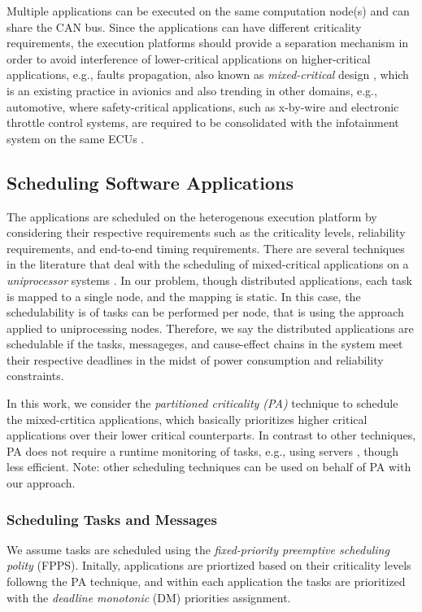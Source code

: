 Multiple applications can be executed on the same computation node(s) and can share the CAN bus. Since the applications can have different criticality requirements, the execution platforms should provide a separation mechanism in order to avoid interference of lower-critical applications on higher-critical applications, e.g., faults propagation, also known as   \textit{mixed-critical} design \cite{Vestal2007PreemptiveAssurance}, which is an existing practice in avionics and also trending in other domains, e.g., automotive, where  safety-critical applications, such as x-by-wire and electronic throttle control systems, are required to be consolidated with the infotainment system on the same ECUs \cite{bibid}.

\subsection{Scheduling Software Applications}
The applications are scheduled on the heterogenous execution platform by considering their respective requirements such as the criticality levels, reliability requirements, and end-to-end timing requirements. There are several techniques in the literature that deal with the scheduling of mixed-critical applications on a \textit{uniprocessor} systems \cite{Vestal2007PreemptiveAssurance}. In our problem, though distributed applications, each task is mapped to a single node, and the mapping is static. In this case, the schedulability is of tasks can be performed per node, that is using the approach applied to uniprocessing nodes. Therefore, we say the distributed applications are schedulable if the tasks, messageges, and cause-effect chains in the system meet their respective deadlines in the midst of power consumption and reliability constraints. 

In this work, we consider the \textit{partitioned criticality (PA)}  technique to schedule the mixed-crtitica applications, which basically prioritizes higher critical applications over their lower critical counterparts. In contrast to other techniques, PA does not require a runtime monitoring of tasks, e.g., using servers \cite{AbeniIntegratingSystems,Ashjaei2017DesigningSystems,Inam2014ThePlatforms}, though less efficient. Note: other scheduling techniques can be used on behalf of PA with our approach.

\subsubsection{Scheduling Tasks and Messages}\label{subsec_responsetimeanalysis}
We assume tasks are scheduled using the \textit{fixed-priority preemptive scheduling polity} (FPPS). Initally, applications are priortized based on their criticality levels followng the PA technique, and within each application the tasks are prioritized with the \textit{deadline monotonic} (DM) priorities assignment. 

